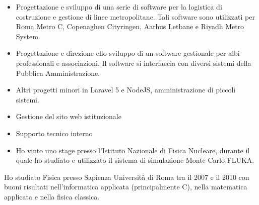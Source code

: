\documentclass[10pt,a4paper]{altacv}
\begin{document}

\begin{fullwidth}
\makecvheader
\end{fullwidth}


\begin{itemize}
\item Progettazione e sviluppo di una serie di software per la logistica di costruzione e gestione di linee metropolitane. Tali software sono utilizzati per Roma Metro C, Copenaghen Cityringen, Aarhus Letbane e Riyadh Metro System.
\item Progettazione e direzione ello sviluppo di un software gestionale per albi professionali e associazioni. Il software si interfaccia con diversi sistemi della Pubblica Amministrazione.
\item Altri progetti minori in Laravel 5 e NodeJS, amministrazione di piccoli sistemi.
\end{itemize}

\divider

\begin{itemize}
\item Gestione del sito web istituzionale
\item Supporto tecnico interno
\end{itemize}


\begin{itemize}
\item Ho vinto uno stage presso l'Istituto Nazionale di Fisica Nucleare, durante il quale ho studiato e utilizzato il sistema di simulazione Monte Carlo FLUKA.
\end{itemize}

Ho studiato Fisica presso Sapienza Università di Roma tra il 2007 e il 2010 con buoni risultati nell'informatica applicata (principalmente C), nella matematica applicata e nella fisica classica.
\end{document}
